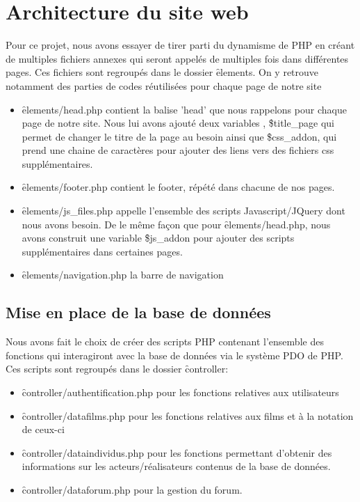\chapter{Architecture du site web}

    Pour ce projet, nous avons essayer de tirer parti du dynamisme de PHP en créant de multiples fichiers annexes qui seront appelés de multiples fois dans différentes pages. Ces fichiers sont regroupés dans le dossier \f{elements}. On y retrouve notamment des parties de codes réutilisées pour chaque page de notre site

    \begin{itemize}
        \item \f{elements/head.php} contient la balise 'head' que nous rappelons pour chaque page de notre site. Nous lui avons ajouté deux variables , \f{\$title\_page} qui permet de changer le titre de la page au besoin ainsi que \f{\$css\_addon}, qui prend une chaine de caractères pour ajouter des liens vers des fichiers css supplémentaires.
        \item \f{elements/footer.php} contient le footer, répété dans chacune de nos pages.
        \item \f{elements/js\_files.php} appelle l'ensemble des scripts Javascript/JQuery dont nous avons besoin. De le même façon que pour \f{elements/head.php}, nous avons construit une variable \f{\$js\_addon} pour ajouter des scripts supplémentaires dans certaines pages.
        \item \f{elements/navigation.php} la barre de navigation
    \end{itemize}

    
    \section{Mise en place de la base de données}

        Nous avons fait le choix de créer des scripts PHP contenant l'ensemble des fonctions qui interagiront avec la base de données via le système PDO de PHP. Ces scripts sont regroupés dans le dossier \f{controller}:

        \begin{itemize}
            \item \f{controller/authentification.php} pour les fonctions relatives aux utilisateurs
            \item \f{controller/datafilms.php} pour les fonctions relatives aux films et à la notation de ceux-ci
            \item \f{controller/dataindividus.php} pour les fonctions permettant d'obtenir des informations sur les acteurs/réalisateurs contenus de la base de données.
            \item \f{controller/dataforum.php} pour la gestion du forum.
        \end{itemize}
        

